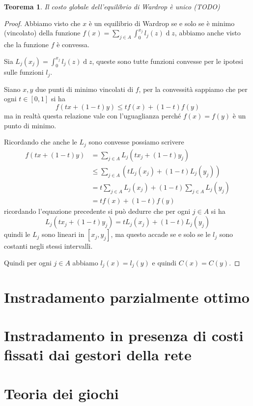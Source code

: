 \documentclass[a4paper]{article}
\newcounter{counter1}
\theoremstyle{plain}
\newtheorem{myteo}[counter1]{Teorema}
\theoremstyle{definition}
\theoremstyle{remark}
\newcommand{\pa}[1]{\left(#1\right)}
\newcommand{\bra}[1]{\left[#1\right]}
\DeclareMathOperator{\de}{d}
\begin{document}
\begin{myteo}
  Il costo globale dell'equilibrio di Wardrop è unico (TODO)
\end{myteo}
\begin{proof}
  Abbiamo visto che $x$ è un equilibrio di Wardrop se e solo se è
  minimo (vincolato) della funzione $f(x) = \sum _{j\in A} \int _0
  ^{x_j} l_j(z)\de z$, abbiamo anche visto che la funzione $f$ è
  convessa.

  Sia $L_j(x_j) = \int _0 ^{x_j} l_j(z)\de z$, queste sono tutte
  funzioni convesse per le ipotesi sulle funzioni $l_j$.

  Siano $x,y$ due punti di minimo vincolati di $f$, per la convessità
  sappiamo che per ogni $t\in\bra{0,1}$ si ha
  \[ f\pa{ tx + (1-t)y} \le tf(x) + (1-t)f(y) \]
  ma in realtà questa relazione vale con l'uguaglianza perché
  $f(x)=f(y)$ è un punto di minimo.

  Ricordando che anche le $L_j$ sono convesse possiamo scrivere
  \begin{align*}
    f\pa{ tx + (1-t)y} & = \sum _{j\in A} L_j\pa{tx_j + (1-t)y_j} \\
    & \le \sum _{j\in A} \pa{ tL_j(x_j) + (1-t)L_j(y_j)} \\
    & = t \sum _{j\in A} L_j(x_j) + (1-t)\sum _{j\in A} L_j(y_j) \\
    & = tf(x) + (1-t)f(y)
  \end{align*}
  ricordando l'equazione precedente si può dedurre che per ogni $j\in
  A$ si ha
  \[ L_j\pa{tx_j + (1-t)y_j} = tL_j(x_j) + (1-t)L_j(y_j) \]
  quindi le $L_j$ sono lineari in $\bra{x_j,y_j}$, ma questo accade se
  e solo se le $l_j$ sono costanti negli stessi intervalli.

  Quindi per ogni $j\in A$ abbiamo $l_j(x) = l_j(y)$ e quindi $C(x) = C(y)$.  
\end{proof}

\section{Instradamento parzialmente ottimo}

\section{Instradamento in presenza di costi fissati dai gestori della rete}

\appendix

\section{Teoria dei giochi}
\label{sec:teoria-giochi}

\cite{menache2011network}




\end{document}
